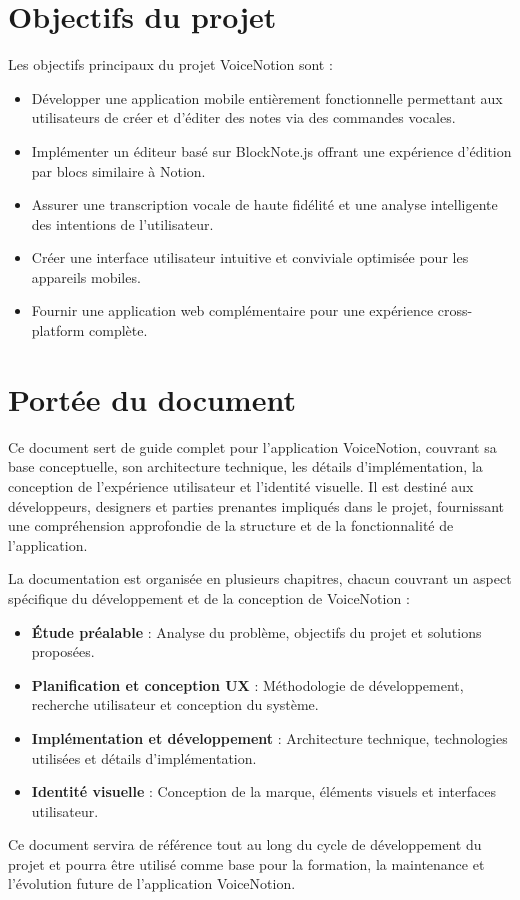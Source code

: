 \section*{Objectifs du projet}

Les objectifs principaux du projet VoiceNotion sont :

\begin{itemize}
    \item Développer une application mobile entièrement fonctionnelle permettant aux utilisateurs de créer et d'éditer des notes via des commandes vocales.
    \item Implémenter un éditeur basé sur BlockNote.js offrant une expérience d'édition par blocs similaire à Notion.
    \item Assurer une transcription vocale de haute fidélité et une analyse intelligente des intentions de l'utilisateur.
    \item Créer une interface utilisateur intuitive et conviviale optimisée pour les appareils mobiles.
    \item Fournir une application web complémentaire pour une expérience cross-platform complète.
\end{itemize}

\vspace{1cm}

\section*{Portée du document}

Ce document sert de guide complet pour l'application VoiceNotion, couvrant sa base conceptuelle, son architecture technique, les détails d'implémentation, la conception de l'expérience utilisateur et l'identité visuelle. Il est destiné aux développeurs, designers et parties prenantes impliqués dans le projet, fournissant une compréhension approfondie de la structure et de la fonctionnalité de l'application.

La documentation est organisée en plusieurs chapitres, chacun couvrant un aspect spécifique du développement et de la conception de VoiceNotion :

\begin{itemize}
    \item \textbf{Étude préalable} : Analyse du problème, objectifs du projet et solutions proposées.
    \item \textbf{Planification et conception UX} : Méthodologie de développement, recherche utilisateur et conception du système.
    \item \textbf{Implémentation et développement} : Architecture technique, technologies utilisées et détails d'implémentation.
    \item \textbf{Identité visuelle} : Conception de la marque, éléments visuels et interfaces utilisateur.
\end{itemize}

Ce document servira de référence tout au long du cycle de développement du projet et pourra être utilisé comme base pour la formation, la maintenance et l'évolution future de l'application VoiceNotion. 
